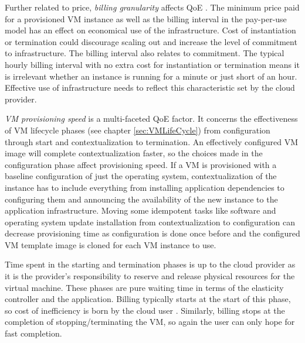 \documentclass[english]{tktltiki2}
\theoremstyle{definition}
\theoremstyle{remark}
\begin{document}
Further related to price, \textit{billing granularity} affects QoE . The minimum price paid for a provisioned VM instance as
well as the billing interval in the pay-per-use model has an effect on
economical use of the infrastructure. Cost of instantiation or termination could
discourage scaling out and increase the level of commitment to infrastructure.
The billing interval also relates to commitment. The typical hourly billing
interval with no extra cost for instantiation or termination means it is
irrelevant whether an instance is running for a minute or just short of an hour.
Effective use of infrastructure needs to reflect this characteristic set by the
cloud provider.

\textit{VM provisioning speed} is a multi-faceted QoE factor. It concerns the
effectiveness of VM lifecycle phases (see chapter \ref{sec:VMLifeCycle}) from
configuration through start and contextualization to termination. An effectively
configured VM image will complete contextualization faster, so the choices made
in the configuration phase affect provisioning speed. If a VM is provisioned
with a baseline configuration of just the operating system, contextualization of
the instance has to include everything from installing application dependencies
to configuring them and announcing the availability of the new instance to the
application infrastructure. Moving some idempotent tasks like software and
operating system update installation from contextualization to configuration can
decrease provisioning time as configuration is done once before and the
configured VM template image is cloned for each VM instance to use.

Time spent in the starting and termination phases is up to the cloud provider as
it is the provider's responsibility to reserve and release physical resources
for the virtual machine. These phases are pure waiting time in terms of the
elasticity controller and the application. Billing typically starts at the start
of this phase, so cost of inefficiency is born by the cloud user . Similarly,
billing stops at the completion of stopping/terminating the VM, so again the
user can only hope for fast completion.
\end{document}
